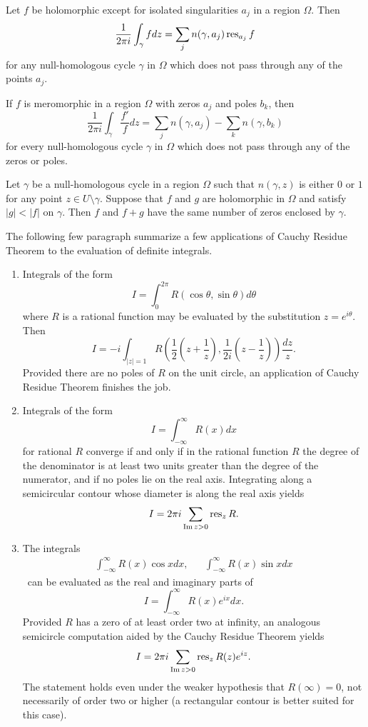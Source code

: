 \begin{theorem}
  Let $f$ be holomorphic except for isolated singularities $a_j$ in a region $\Omega$. Then
  \[
  \frac{1}{2 \pi i} \int_\gamma f d z = \sum_j n(\gamma,a_j) \operatorname{res}_{a_j} f
  \]
  for any null-homologous cycle $\gamma$ in $\Omega$ which does not pass through any of the points $a_j$.
\end{theorem}

\begin{corollary}
  If $f$ is meromorphic in a region $\Omega$ with zeros $a_j$ and poles $b_k$, then
  \[
  \frac{1}{2 \pi i} \int_\gamma \frac{f'}{f} d z = \sum_j n(\gamma,a_j) - \sum_k n(\gamma, b_k)
  \]
  for every null-homologous cycle $\gamma$ in $\Omega$ which does not pass through any of the zeros or poles.
\end{corollary}

\begin{corollary}
  Let $\gamma$ be a null-homologous cycle in a region $\Omega$ such that $n(\gamma,z)$ is either $0$ or $1$ for any point $z \in U \setminus \gamma$. Suppose that $f$ and $g$ are holomorphic in $\Omega$ and satisfy $|g| < |f|$ on $\gamma$. Then $f$ and $f+g$ have the same number of zeros enclosed by $\gamma$.
\end{corollary}

The following few paragraph summarize a few applications of Cauchy Residue Theorem to the evaluation of definite integrals.
\begin{enumerate}[1.]
\item
  Integrals of the form
  \[
  I = \int_0^{2\pi} R(\cos\theta,\sin\theta) d\theta
  \]
  where $R$ is a rational function may be evaluated by the substitution $z = e^{i\theta}$. Then
  \[
  I = -i \int_{|z|=1} R\left( \frac{1}{2}\left( z + \frac{1}{z} \right), \frac{1}{2i}\left( z - \frac{1}{z} \right) \right) \frac{d z}{z}.
  \]
  Provided there are no poles of $R$ on the unit circle, an application of Cauchy Residue Theorem finishes the job.
\item
  Integrals of the form
  \[
  I = \int_{-\infty}^\infty R(x) d x
  \]
  for rational $R$ converge if and only if in the rational function $R$ the degree of the denominator is at least two units greater than the degree of the numerator, and if no poles lie on the real axis. Integrating along a semicircular contour whose diameter is along the real axis yields
  \[
  I = 2 \pi i \sum_{\mathop{\textnormal{Im}}\nolimits z > 0} \operatorname{res}_z R.
  \]
\item
  The integrals
  \begin{align*}
    \int_{-\infty}^\infty R(x) \cos x d x, && \int_{-\infty}^\infty R(x) \sin x d x
  \end{align*}\
  can be evaluated as the real and imaginary parts of
  \[
  I = \int_{-\infty}^\infty R(x) e^{i x} d x.
  \]
  Provided $R$ has a zero of at least order two at infinity, an analogous semicircle computation aided by the Cauchy Residue Theorem yields
  \[
  I = 2 \pi i \sum_{\mathop{\textnormal{Im}}\nolimits z > 0} \operatorname{res}_z R(z)e^{i z}.
  \]
  The statement holds even under the weaker hypothesis that $R(\infty) = 0$, not necessarily of order two or higher (a rectangular contour is better suited for this case).
\end{enumerate}

